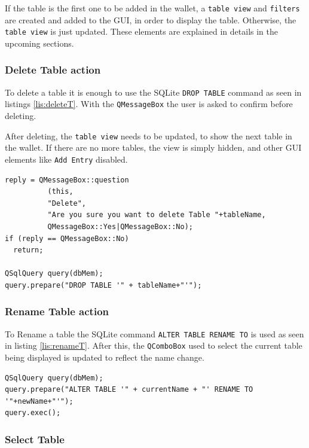 If the table is the first one to be added in the wallet, a \texttt{table view} and \texttt{filters} are created and added to the GUI, in order to display the table. Otherwise, the \texttt{table view} is just updated. These elements are explained in details in the upcoming sections.

\subsubsection*{Delete Table action}

To delete a table it is enough to use the SQLite \texttt{DROP TABLE} command as seen in listings \ref{lis:deleteT}. With the \texttt{QMessageBox} the user is asked to confirm before deleting.

After deleting, the \texttt{table view} needs to be updated, to show the next table in the wallet. If there are no more tables, the view is simply hidden, and other GUI elements like \texttt{Add Entry} disabled.

\begin{lstlisting}[style=customc, float=htb, caption={Delete Table}, label = {lis:deleteT}]
reply = QMessageBox::question
          (this,
          "Delete",
          "Are you sure you want to delete Table "+tableName,
          QMessageBox::Yes|QMessageBox::No);
if (reply == QMessageBox::No)
  return;

QSqlQuery query(dbMem);
query.prepare("DROP TABLE '" + tableName+"'");
\end{lstlisting}

\subsubsection*{Rename Table action}
To Rename a table the SQLite command \texttt{ALTER TABLE RENAME TO} is used as seen in listing \ref{lis:renameT}. After this, the \texttt{QComboBox} used to select the current table being displayed is updated to reflect the name change.
\begin{lstlisting}[style=customc, float=htb, caption={Rename Table}, label = {lis:renameT}]
QSqlQuery query(dbMem);
query.prepare("ALTER TABLE '" + currentName + "' RENAME TO '"+newName+"'");
query.exec();
\end{lstlisting}

\subsubsection*{Select Table}

